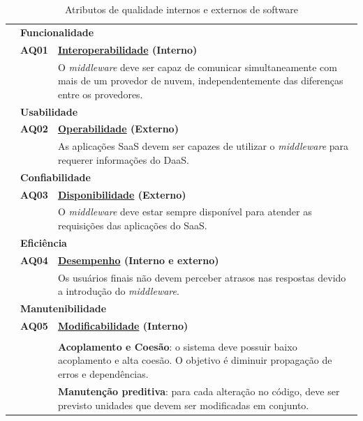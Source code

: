 \documentclass[11pt,a4paper]{article}
\begin{document}
\begin{table}[htb]
\centering
\caption{Atributos de qualidade internos e externos de software} \label{tab:aqs}
\begin{tabular*}{\linewidth}{@{\extracolsep{\fill}}|r r p{12.5cm}|} \hline

& \multicolumn{2}{l|}{\textbf{Funcionalidade}}  \\ \cline{2-3}

&\textbf{AQ01} & \textbf{\underline{Interoperabilidade} (Interno)}\\ 
& & O \textit{middleware} deve ser capaz de comunicar simultaneamente com mais de um provedor de nuvem, independentemente das diferenças entre os provedores.  \\\cline{1-3}

 & \multicolumn{2}{l|}{\textbf{Usabilidade}} \\ \cline{2-3}
 
&\textbf{AQ02} & \textbf{\underline{Operabilidade} (Externo)}\\
& & As aplicações SaaS devem ser capazes de utilizar o \textit{middleware} para requerer informações do DaaS.  \\ \cline{1-3}

& \multicolumn{2}{l|}{\textbf{Confiabilidade}} \\ \cline{2-3}
 
&\textbf{AQ03} & \textbf{\underline{Disponibilidade} (Externo)}\\ 
& & O \textit{middleware} deve estar sempre disponível para atender as requisições das aplicações do SaaS.  \\ \hline

& \multicolumn{2}{l|}{\textbf{Eficiência}} \\ \cline{2-3}

&\textbf{AQ04} & \textbf{\underline{Desempenho} (Interno e externo)}\\ 
& & Os usuários finais não devem perceber atrasos nas respostas devido a introdução do \textit{middleware}.  \\ \hline

& \multicolumn{2}{l|}{\textbf{Manutenibilidade}} \\ \cline{2-3}

&\textbf{AQ05} & \textbf{\underline{Modificabilidade} (Interno)}\\ 
& &  \\&
&\textbf{Acoplamento e Coesão}: o sistema deve possuir baixo acoplamento e alta coesão. O objetivo é diminuir propagação de erros e dependências. \\&
&\textbf{Manutenção preditiva}: para cada alteração no código, deve ser previsto unidades que devem ser modificadas em conjunto.  \\ \cline{1-3}
 

\end{tabular*}
\end{table}
\end{document}
